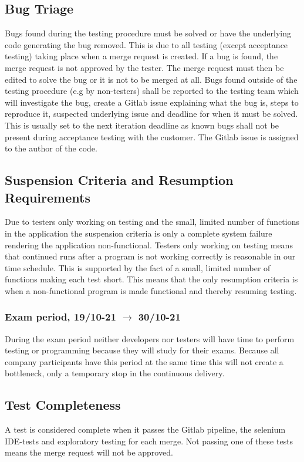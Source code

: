 \subsection{Bug Triage}
Bugs found during the testing procedure must be solved or have the underlying code generating the bug removed. This is due to all testing (except acceptance testing) taking place when a merge request is created. If a bug is found, the merge request is not approved by the tester. The merge request must then be edited to solve the bug or it is not to be merged at all. Bugs found outside of the testing procedure (e.g by non-testers) shall be reported to the testing team which will investigate the bug, create a Gitlab issue explaining what the bug is, steps to reproduce it, suspected underlying issue and deadline for when it must be solved. This is usually set to the next iteration deadline as known bugs shall not be present during acceptance testing with the customer. The Gitlab issue is assigned to the author of the code. 

\subsection{Suspension Criteria and Resumption Requirements}
Due to testers only working on testing and the small, limited number of functions in the application the suspension criteria is only a complete system failure rendering the application non-functional. Testers only working on testing means that continued runs after a program is not working correctly is reasonable in our time schedule. This is supported by the fact of a small, limited number of functions making each test short. This means that the only resumption criteria is when a non-functional program is made functional and thereby resuming testing.    
\subsubsection{Exam period, 19/10-21 $\xrightarrow{}$ 30/10-21}
During the exam period neither developers nor testers will have time to perform testing or programming because they will study for their exams. Because all company participants have this period at the same time this will not create a bottleneck, only a temporary stop in the continuous delivery.
\subsection{Test Completeness}
A test is considered complete when it passes the Gitlab pipeline, the selenium IDE-tests and exploratory testing for each merge. Not passing one of these tests means the merge request will not be approved.